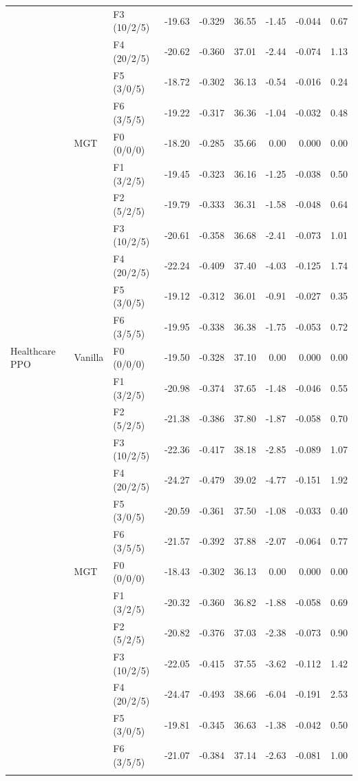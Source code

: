\begin{table}[!t]
\begin{tabular}{lllrrrrrr}
 &  & F3 (10/2/5) & -19.63 & -0.329 & 36.55 & -1.45 & -0.044 & 0.67 \\
 &  & F4 (20/2/5) & -20.62 & -0.360 & 37.01 & -2.44 & -0.074 & 1.13 \\
 &  & F5 (3/0/5) & -18.72 & -0.302 & 36.13 & -0.54 & -0.016 & 0.24 \\
 &  & F6 (3/5/5) & -19.22 & -0.317 & 36.36 & -1.04 & -0.032 & 0.48 \\
\addlinespace
 & MGT & F0 (0/0/0) & -18.20 & -0.285 & 35.66 & 0.00 & 0.000 & 0.00 \\
 &  & F1 (3/2/5) & -19.45 & -0.323 & 36.16 & -1.25 & -0.038 & 0.50 \\
 &  & F2 (5/2/5) & -19.79 & -0.333 & 36.31 & -1.58 & -0.048 & 0.64 \\
 &  & F3 (10/2/5) & -20.61 & -0.358 & 36.68 & -2.41 & -0.073 & 1.01 \\
 &  & F4 (20/2/5) & -22.24 & -0.409 & 37.40 & -4.03 & -0.125 & 1.74 \\
 &  & F5 (3/0/5) & -19.12 & -0.312 & 36.01 & -0.91 & -0.027 & 0.35 \\
 &  & F6 (3/5/5) & -19.95 & -0.338 & 36.38 & -1.75 & -0.053 & 0.72 \\
\addlinespace
\midrule
Healthcare PPO & Vanilla & F0 (0/0/0) & -19.50 & -0.328 & 37.10 & 0.00 & 0.000 & 0.00 \\
 &  & F1 (3/2/5) & -20.98 & -0.374 & 37.65 & -1.48 & -0.046 & 0.55 \\
 &  & F2 (5/2/5) & -21.38 & -0.386 & 37.80 & -1.87 & -0.058 & 0.70 \\
 &  & F3 (10/2/5) & -22.36 & -0.417 & 38.18 & -2.85 & -0.089 & 1.07 \\
 &  & F4 (20/2/5) & -24.27 & -0.479 & 39.02 & -4.77 & -0.151 & 1.92 \\
 &  & F5 (3/0/5) & -20.59 & -0.361 & 37.50 & -1.08 & -0.033 & 0.40 \\
 &  & F6 (3/5/5) & -21.57 & -0.392 & 37.88 & -2.07 & -0.064 & 0.77 \\
\addlinespace
 & MGT & F0 (0/0/0) & -18.43 & -0.302 & 36.13 & 0.00 & 0.000 & 0.00 \\
 &  & F1 (3/2/5) & -20.32 & -0.360 & 36.82 & -1.88 & -0.058 & 0.69 \\
 &  & F2 (5/2/5) & -20.82 & -0.376 & 37.03 & -2.38 & -0.073 & 0.90 \\
 &  & F3 (10/2/5) & -22.05 & -0.415 & 37.55 & -3.62 & -0.112 & 1.42 \\
 &  & F4 (20/2/5) & -24.47 & -0.493 & 38.66 & -6.04 & -0.191 & 2.53 \\
 &  & F5 (3/0/5) & -19.81 & -0.345 & 36.63 & -1.38 & -0.042 & 0.50 \\
 &  & F6 (3/5/5) & -21.07 & -0.384 & 37.14 & -2.63 & -0.081 & 1.00 \\
\addlinespace
\bottomrule
\end{tabular}\end{table}